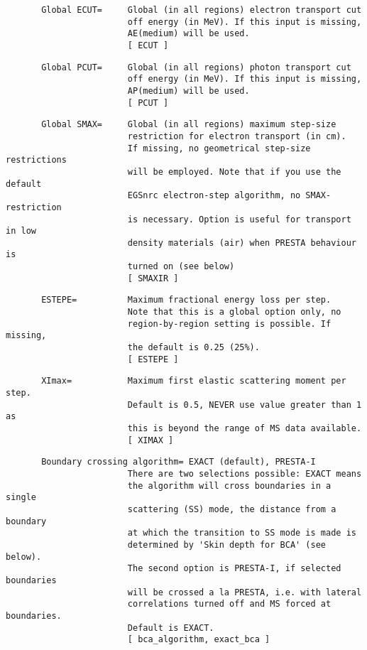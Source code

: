 \begin{verbatim}
       Global ECUT=     Global (in all regions) electron transport cut
                        off energy (in MeV). If this input is missing,
                        AE(medium) will be used.
                        [ ECUT ]
\end{verbatim}
\begin{verbatim}
       Global PCUT=     Global (in all regions) photon transport cut
                        off energy (in MeV). If this input is missing,
                        AP(medium) will be used.
                        [ PCUT ]
\end{verbatim}
\begin{verbatim}
       Global SMAX=     Global (in all regions) maximum step-size
                        restriction for electron transport (in cm).
                        If missing, no geometrical step-size restrictions
                        will be employed. Note that if you use the default
                        EGSnrc electron-step algorithm, no SMAX-restriction
                        is necessary. Option is useful for transport in low
                        density materials (air) when PRESTA behaviour is
                        turned on (see below)
                        [ SMAXIR ]
\end{verbatim}
\begin{verbatim}
       ESTEPE=          Maximum fractional energy loss per step.
                        Note that this is a global option only, no
                        region-by-region setting is possible. If missing,
                        the default is 0.25 (25%).
                        [ ESTEPE ]
\end{verbatim}
\begin{verbatim}
       XImax=           Maximum first elastic scattering moment per step.
                        Default is 0.5, NEVER use value greater than 1 as
                        this is beyond the range of MS data available.
                        [ XIMAX ]
\end{verbatim}
\begin{verbatim}
       Boundary crossing algorithm= EXACT (default), PRESTA-I
                        There are two selections possible: EXACT means
                        the algorithm will cross boundaries in a single
                        scattering (SS) mode, the distance from a boundary
                        at which the transition to SS mode is made is
                        determined by 'Skin depth for BCA' (see below).
                        The second option is PRESTA-I, if selected boundaries
                        will be crossed a la PRESTA, i.e. with lateral
                        correlations turned off and MS forced at boundaries.
                        Default is EXACT.
                        [ bca_algorithm, exact_bca ]
\end{verbatim}
